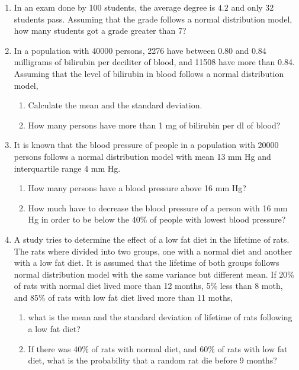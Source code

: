 \begin{enumerate}[leftmargin=*,resume]
\item In an exam done by 100 students, the average degree is $4.2$ and only 32 students pass.
Assuming that the grade follows a normal distribution model, how many students got a grade greater than 7?

\item In a population with 40000 persons, 2276 have between 0.80 and 0.84 milligrams of bilirubin per deciliter of
blood, and 11508 have more than 0.84.
Assuming that the level of bilirubin in blood follows a normal distribution model, 
\begin{enumerate}
\item Calculate the mean and the standard deviation.
\item How many persons have more than 1 mg of bilirubin per dl of blood?
\end{enumerate}

\item It is known that the blood pressure of people in a population with 20000 persons follows a normal distribution
model with mean 13 mm Hg and interquartile range 4 mm Hg.
\begin{enumerate}
\item How many persons have a blood pressure above 16 mm Hg?
\item How much have to decrease the blood pressure of a person with 16 mm Hg in order to be below the 40\% of
people with lowest blood pressure?
\end{enumerate}

\item A study tries to determine the effect of a low fat diet in the lifetime of rats.
The rats where divided into two groups, one with a normal diet and another with a low fat diet.
It is assumed that the lifetime of both groups follows normal distribution model with the same variance but different
mean.
If 20\% of rats with normal diet lived more than 12 months, 5\% less than 8 moth, and 85\% of rats with low fat diet
lived more than 11 moths,
\begin{enumerate}
\item what is the mean and the standard deviation of lifetime of rats following a low fat diet?
\item If there was 40\% of rats with normal diet, and 60\% of rats with low fat diet, what is the probability that a
random rat die before 9 months?
\end{enumerate}


\end{enumerate}
